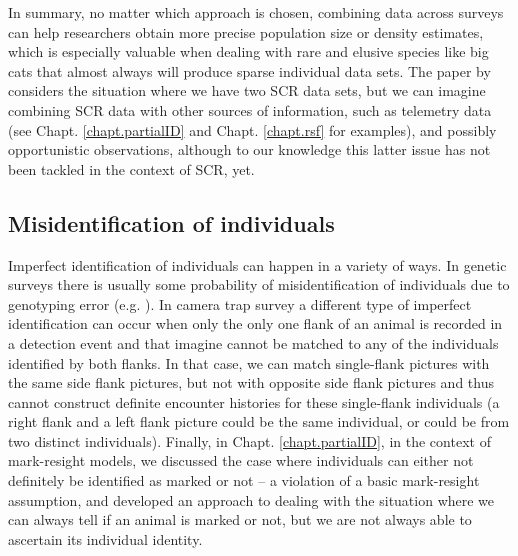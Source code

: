 In summary, no matter which approach is chosen, combining data across
surveys can help researchers %
obtain more precise population size or
density
estimates, which is especially valuable when dealing with rare and
elusive species like big cats that almost always will produce sparse
individual data sets.
The paper by \citet{gopalaswamy_etal:2012mee} considers the
situation where we have two SCR data sets, but we can imagine
combining SCR data with other sources of information, such as
telemetry data (see Chapt. \ref{chapt.partialID} and
Chapt. \ref{chapt.rsf} for examples), and possibly opportunistic
observations, although to our knowledge this latter issue has not been
tackled in the context of SCR, yet.


\subsection{Misidentification of individuals}

Imperfect identification of individuals can happen in a variety of
ways. In genetic surveys there is usually some probability of
misidentification of individuals due to genotyping error
(e.g. \citet{lukacs_burnham:2005}). In camera trap survey a different
type of imperfect identification can occur when only the only one
flank of an animal is recorded in a detection event and that imagine
cannot be matched to any of the individuals identified by both
flanks. In that case, we can match single-flank pictures with the same
side flank pictures, but not with opposite side flank pictures and
thus cannot construct definite encounter histories for these
single-flank individuals (a right flank and a left flank picture could
be the same individual, or could be from two distinct
individuals). Finally, in Chapt. \ref{chapt.partialID}, in the context
of mark-resight models, we discussed the case where individuals can
either not definitely be identified as marked or not -- a violation of
a basic mark-resight assumption, and developed an approach to dealing
with the situation where we can always tell if an animal is marked or
not, but we are not always able to ascertain its individual identity.

